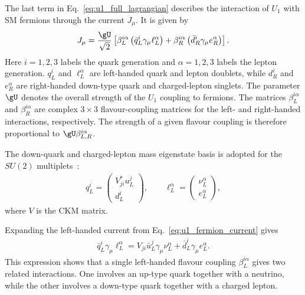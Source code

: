The last term in Eq.~\eqref{eq:u1_full_lagrangian} describes the interaction of $U_{1}$ with SM fermions through the current $J_{\mu}$. It is given by
\begin{align}
    J_{\mu}
    =
    \frac{\gU}{\sqrt{2}}
    \left[
        \beta_{L}^{i\alpha}
        \left(
            \bar{q}_{L}^{i}
            \gamma_{\mu}
            \ell_{L}^{\alpha}
        \right)
        +
        \beta_{R}^{i\alpha}
        \left(
            \bar{d}_{R}^{i}
            \gamma_{\mu}
            e_{R}^{\alpha}
        \right)
    \right].
    \label{eq:u1_fermion_current}
\end{align}
Here $i=1,2,3$ labels the quark generation and $\alpha=1,2,3$ labels the lepton generation. $q_{L}^{i}$ and $\ell_{L}^{\alpha}$ are left-handed quark and lepton doublets, while $d_{R}^{i}$ and $e_{R}^{\alpha}$ are right-handed down-type quark and charged-lepton singlets. 
The parameter $\gU$ denotes the overall strength of the $U_{1}$ coupling to fermions. 
The matrices $\beta_{L}^{i\alpha}$ and $\beta_{R}^{i\alpha}$ are complex $3\times3$ flavour-coupling matrices for the left- and right-handed interactions, respectively. 
The strength of a given flavour coupling is therefore proportional to $\gU\beta_{L,R}^{i\alpha}$.

The down-quark and charged-lepton mass eigenstate basis is adopted for the $SU(2)$ multiplets~\cite{Cornella2019}:
\begin{align}
    q_{L}^{i}
    =
    \begin{pmatrix}
        V_{ji}^{*}u_{L}^{j}\\
        d_{L}^{i}
    \end{pmatrix},
    \qquad
    \ell_{L}^{\alpha}
    =
    \begin{pmatrix}
        \nu_{L}^{\alpha}\\
        e_{L}^{\alpha}
    \end{pmatrix},
    \label{eq:u1_flavour_basis}
\end{align}
where $V$ is the CKM matrix. 

Expanding the left-handed current from Eq.~\ref{eq:u1_fermion_current} gives
\begin{align}
    \bar{q}_{L}^{i}
    \gamma_{\mu}
    \ell_{L}^{\alpha}
    =
    V_{ji}
    \bar{u}_{L}^{j}
    \gamma_{\mu}
    \nu_{L}^{\alpha}
    +
    \bar{d}_{L}^{i}
    \gamma_{\mu}
    e_{L}^{\alpha}.
    \label{eq:u1_current_expanded}
\end{align}
This expression shows that a single left-handed flavour coupling $\beta_{L}^{i\alpha}$ gives two related interactions. 
One involves an up-type quark together with a neutrino, while the other involves a down-type quark together with a charged lepton.

